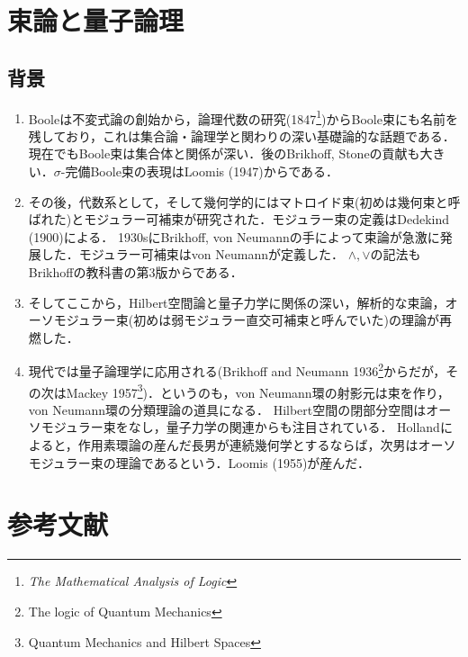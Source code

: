\documentclass[uplatex,dvipdfmx]{jsreport}
\begin{document}
\chapter{束論と量子論理}

\section{背景}

\begin{history}\mbox{}
    \begin{enumerate}
        \item Booleは不変式論の創始から，論理代数の研究(1847\footnote{\textit{The Mathematical Analysis of Logic}})からBoole束にも名前を残しており，これは集合論・論理学と関わりの深い基礎論的な話題である．
        現在でもBoole束は集合体と関係が深い．後のBrikhoff, Stoneの貢献も大きい．$\sigma$-完備Boole束の表現はLoomis (1947)からである．
        \item その後，代数系として，そして幾何学的にはマトロイド束(初めは幾何束と呼ばれた)とモジュラー可補束が研究された．モジュラー束の定義はDedekind (1900)による．
        1930sにBrikhoff, von Neumannの手によって束論が急激に発展した．モジュラー可補束はvon Neumannが定義した．
        $\land,\lor$の記法もBrikhoffの教科書の第3版からである．
        \item 
        そしてここから，Hilbert空間論と量子力学に関係の深い，解析的な束論，オーソモジュラー束(初めは弱モジュラー直交可補束と呼んでいた)の理論が再燃した．
        \item 現代では量子論理学に応用される(Brikhoff and Neumann 1936\footnote{The logic of Quantum Mechanics}からだが，その次はMackey 1957\footnote{Quantum Mechanics and Hilbert Spaces})．というのも，von Neumann環の射影元は束を作り，von Neumann環の分類理論の道具になる．
        Hilbert空間の閉部分空間はオーソモジュラー束をなし，量子力学の関連からも注目されている．
        Hollandによると，作用素環論の産んだ長男が連続幾何学とするならば，次男はオーソモジュラー束の理論であるという．Loomis (1955)が産んだ．
    \end{enumerate}
\end{history}

\chapter{参考文献}
\end{document}
